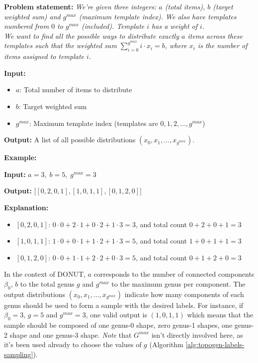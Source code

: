 \begin{tcolorbox}[mybox]
  \textbf{Problem statement:} \emph{We're given three integers: $a$ (total items), $b$ (target weighted sum) and $g^{max}$ (maximum template index). We also have templates numbered from $0$ to $g^{max}$ (included). Template $i$ has a weight of $i$. \\ We want to find all the possible ways to distribute exactly $a$ items across these templates such that the weighted sum $\sum_{i=0}^{g^{max}} i \cdot x_i = b$, where $x_i$ is the number of items assigned to template $i$.} 

  \textbf{Input:}
  \begin{itemize}
    \item $a$: Total number of items to distribute
    \item $b$: Target weighted sum
    \item $g^{max}$: Maximum template index (templates are $0, 1, 2, \dots, g^{max}$)
  \end{itemize}

  \textbf{Output:} A list of all possible distributions $(x_0, x_1, \dots, x_{g^{max}})$.
\end{tcolorbox}

\begin{tcolorbox}[bluebox]
  \textbf{Example:}

  \textbf{Input:} $a = 3,\; b = 5,\; g^{max} = 3$

  \textbf{Output:} $\big[ [0, 2, 0, 1], [1, 0, 1, 1], [0, 1, 2, 0]\big]$

  \textbf{Explanation:}
  \begin{itemize}
    \item $[0, 2, 0, 1]$: $0 \cdot 0 + 2 \cdot 1 + 0 \cdot 2 + 1 \cdot 3 = 3$, and total count $0+2+0+1=3$
    \item $[1, 0, 1, 1]$: $1 \cdot 0 + 0 \cdot 1 + 1 \cdot 2 + 1 \cdot 3 = 5$, and total count $1+0+1+1=3$
    \item $[0, 1, 2, 0]$: $0 \cdot 0 + 1 \cdot 1 + 2 \cdot 2 + 0 \cdot 3 = 5$, and total count $0+1+2+0=3$
  \end{itemize}
\end{tcolorbox}

In the context of DONUT, $a$ corresponds to the number of connected components $\beta_0$, $b$ to the total genus $g$ and $g^{max}$ to the maximum genus per component. The output distributions $(x_0, x_1, \dots, x_{g^{max}})$ indicate how many components of each genus should be used to form a sample with the desired labels. For instance, if $\beta_0 = 3$, $g = 5$ and $g^{max} = 3$, one valid output is $(1, 0, 1, 1)$ which means that the sample should be composed of one genus-0 shape, zero genus-1 shapes, one genus-2 shape and one genus-3 shape. \textit{Note} that $G^{max}$ isn't directly involved here, as it's been used already to choose the values of $g$ (Algorithm \ref{alg:topogen-labels-sampling}).

